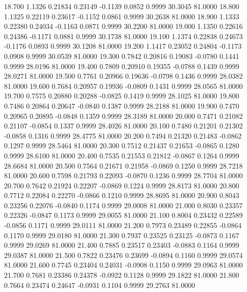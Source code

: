   18.700   1.1326   0.21834   0.23149  -0.1139   0.0852   0.9999  30.3045  81.0000
  18.800   1.1325   0.22119   0.23617  -0.1152   0.0861   0.9999  30.2638  81.0000
  18.900   1.1333   0.22380   0.24034  -0.1163   0.0871   0.9999  30.2200  81.0000
  19.000   1.1350   0.22616   0.24386  -0.1171   0.0881   0.9999  30.1738  81.0000
  19.100   1.1374   0.22838   0.24673  -0.1176   0.0893   0.9999  30.1208  81.0000
  19.200   1.1417   0.23052   0.24804  -0.1173   0.0908   0.9999  30.0539  81.0000
  19.300   0.7842   0.20816   0.19083  -0.0780   0.1441   0.9999  28.0196  81.0000
  19.400   0.7809   0.20910   0.19355  -0.0788   0.1439   0.9999  28.0271  81.0000
  19.500   0.7761   0.20966   0.19636  -0.0798   0.1436   0.9999  28.0382  81.0000
  19.600   0.7684   0.20957   0.19936  -0.0809   0.1431   0.9999  28.0565  81.0000
  19.700   0.7575   0.20880   0.20288  -0.0825   0.1419   0.9999  28.1025  81.0000
  19.800   0.7486   0.20864   0.20647  -0.0840   0.1387   0.9999  28.2188  81.0000
  19.900   0.7470   0.20965   0.20895  -0.0848   0.1359   0.9999  28.3189  81.0000
  20.000   0.7471   0.21082   0.21107  -0.0854   0.1337   0.9999  28.4026  81.0000
  20.100   0.7480   0.21201   0.21302  -0.0858   0.1316   0.9999  28.4775  81.0000
  20.200   0.7494   0.21320   0.21483  -0.0862   0.1297   0.9999  28.5464  81.0000
  20.300   0.7512   0.21437   0.21653  -0.0865   0.1280   0.9999  28.6100  81.0000
  20.400   0.7535   0.21553   0.21812  -0.0867   0.1264   0.9999  28.6684  81.0000
  20.500   0.7564   0.21671   0.21958  -0.0869   0.1250   0.9999  28.7218  81.0000
  20.600   0.7598   0.21793   0.22093  -0.0870   0.1236   0.9999  28.7704  81.0000
  20.700   0.7642   0.21924   0.22207  -0.0869   0.1224   0.9999  28.8173  81.0000
  20.800   0.7712   0.22084   0.22270  -0.0866   0.1210   0.9999  28.8695  81.0000
  20.900   0.8043   0.23256   0.22076  -0.0840   0.1174   0.9999  29.0008  81.0000
  21.000   0.8030   0.23357   0.22326  -0.0847   0.1173   0.9999  29.0055  81.0000
  21.100   0.8004   0.23432   0.22589  -0.0856   0.1171   0.9999  29.0111  81.0000
  21.200   0.7973   0.23489   0.22855  -0.0864   0.1170   0.9999  29.0180  81.0000
  21.300   0.7937   0.23525   0.23125  -0.0873   0.1167   0.9999  29.0269  81.0000
  21.400   0.7885   0.23517   0.23403  -0.0883   0.1164   0.9999  29.0387  81.0000
  21.500   0.7822   0.23476   0.23699  -0.0894   0.1160   0.9999  29.0574  81.0000
  21.600   0.7745   0.23404   0.24031  -0.0908   0.1150   0.9999  29.0963  81.0000
  21.700   0.7681   0.23386   0.24378  -0.0922   0.1128   0.9999  29.1822  81.0000
  21.800   0.7664   0.23474   0.24647  -0.0931   0.1104   0.9999  29.2763  81.0000
